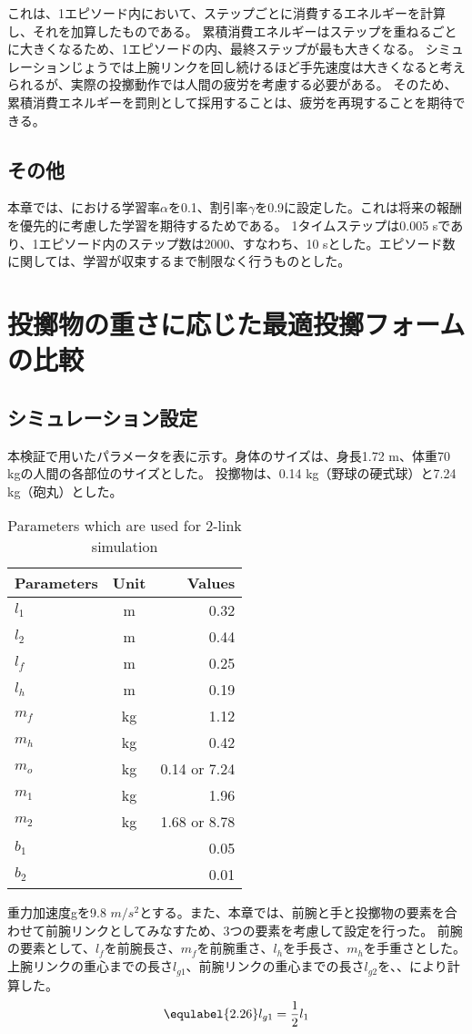 これは、1エピソード内において、ステップごとに消費するエネルギーを計算し、それを加算したものである。
累積消費エネルギーはステップを重ねるごとに大きくなるため、1エピソードの内、最終ステップが最も大きくなる。
シミュレーションじょうでは上腕リンクを回し続けるほど手先速度は大きくなると考えられるが、実際の投擲動作では人間の疲労を考慮する必要がある。
そのため、累積消費エネルギーを罰則として採用することは、疲労を再現することを期待できる。
\subsection{その他}
本章では、における学習率$\alpha$を0.1、割引率$\gamma$を0.9に設定した。これは将来の報酬を優先的に考慮した学習を期待するためである。
1タイムステップは0.005 sであり、1エピソード内のステップ数は2000、すなわち、10 sとした。エピソード数に関しては、学習が収束するまで制限なく行うものとした。
\section{投擲物の重さに応じた最適投擲フォームの比較}
\subsection{シミュレーション設定}
本検証で用いたパラメータを表に示す。身体のサイズは、身長1.72 m、体重70 kgの人間の各部位のサイズとした。
投擲物は、0.14 kg（野球の硬式球）と7.24 kg（砲丸）とした。
\begin{table}[tb]
  \begin{center}
    \caption{Parameters which are used for 2-link simulation}
    \begin{tabular}{l|c|r}
      \hline
      Parameters & Unit & Values \\
      \hline
      $l_{1}$ & m & 0.32 \\
      $l_{2}$ & m & 0.44 \\
      $l_{f}$ & m & 0.25 \\
      $l_{h}$ & m & 0.19 \\
      $m_{f}$ & kg & 1.12 \\
      $m_{h}$ & kg & 0.42 \\
      $m_{o}$ & kg & 0.14 or 7.24 \\
      $m_{1}$ & kg & 1.96 \\
      $m_{2}$ & kg & 1.68 or 8.78 \\
      $b_{1}$ &  & 0.05 \\
      $b_{2}$ &  & 0.01 \\
      \hline
    \end{tabular}
  \end{center}
\end{table}
重力加速度gを9.8 $m/s^{2}$とする。また、本章では、前腕と手と投擲物の要素を合わせて前腕リンクとしてみなすため、3つの要素を考慮して設定を行った。
前腕の要素として、$l_{f}$を前腕長さ、$m_{f}$を前腕重さ、$l_{h}$を手長さ、$m_{h}$を手重さとした。\\
上腕リンクの重心までの長さ$l_{g1}$、前腕リンクの重心までの長さ$l_{g2}$を、、により計算した。
\begin{eqnarray}
  \equlabel{2.26}
  l_{g1}=\frac{1}{2}l_{1}
\end{eqnarray}

